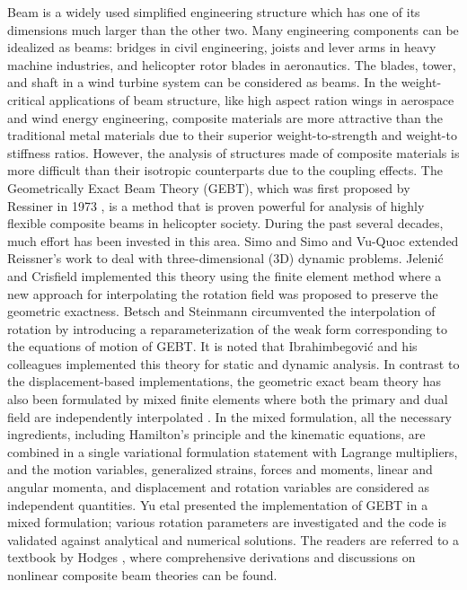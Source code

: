 \documentclass{aiaa-tc}
\begin{document}
Beam is a widely used simplified engineering structure which has one of its dimensions much larger than the other two. Many engineering components can be idealized as beams: bridges in civil engineering, joists and lever arms in heavy machine industries, and helicopter rotor blades in aeronautics. The blades, tower, and shaft in a wind turbine system can be considered as beams. In the weight-critical applications of beam structure, like high aspect ration wings in aerospace and wind energy engineering, composite materials are more attractive than the traditional metal materials due to their superior weight-to-strength and weight-to stiffness ratios. However, the analysis of structures made of composite materials is more difficult than their isotropic counterparts due to the coupling effects. The Geometrically Exact Beam Theory (GEBT), which was first proposed by Ressiner in 1973 \cite{Ressiner1973}, is a method that is proven powerful for analysis of highly flexible composite beams in helicopter society. During the past several decades, much effort has been invested in this area. Simo \cite{Simo1985} and Simo and Vu-Quoc \cite{Simo1986} extended Reissner's work to deal with three-dimensional (3D) dynamic problems. Jeleni\'c and Crisfield \cite{Crisfield1999} implemented this theory using the finite element method where a new approach for interpolating the rotation field was proposed to preserve the geometric exactness. Betsch and Steinmann \cite{Betsch2002} circumvented the interpolation of rotation by introducing a reparameterization of the weak form corresponding to the equations of motion of GEBT. It is noted that Ibrahimbegovi\'c and his colleagues implemented this theory for static \cite{Ibrahim1995} and dynamic \cite{Ibrahim1998} analysis. In contrast to the displacement-based implementations, the geometric exact beam theory has also
been formulated by mixed finite elements where both the primary and dual field are independently interpolated \cite{CookFEM}. In the mixed
formulation, all the necessary ingredients, including Hamilton's principle and the kinematic equations, are combined in a single variational
formulation statement with Lagrange multipliers, and the motion variables, generalized strains, forces and moments, linear and angular momenta, and displacement and rotation variables are considered as independent quantities. Yu etal \cite{YuGEBT, Wang:GEBT2013} presented the implementation of GEBT in a mixed formulation; various rotation parameters are investigated and the code is validated against analytical and numerical solutions. The readers are referred to a textbook by Hodges \cite{HodgesBeamBook}, where comprehensive derivations and discussions on nonlinear composite beam theories can be found.
\end{document}
